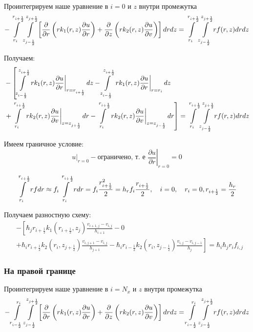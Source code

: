 Проинтегрируем наше уравнение в $ i = 0 $ и $ z $ внутри промежутка
\[
  - \int\limits^{r_{i +\frac{1}{2}}}_{r_{i }} \int\limits^{z_{j +\frac{1}{2}}}_{z_{j -\frac{1}{2}}} \left [ \pdv{}{r} \left ( r k_1(r, z) \pdv{u}{r} \right ) 
  + \pdv{}{z} \left ( rk_2(r, z)\pdv{u}{v} \right ) \right ] dr dz = \int\limits^{r_{i +\frac{1}{2}}}_{r_{i }} \int\limits^{z_{j +\frac{1}{2}}}_{z_{j -\frac{1}{2}}} rf(r, z) dr dz
\]

Получаем:
\begin{align*}
  &- \left [
   \int\limits^{z_{i+\frac{1}{2}}}_{z_{i-\frac{1}{2}}}  \left . r k_1(r, z) \pdv{u}{r} \right \vert_{r = r_{i + \frac{1}{2}}} dz
  - \int\limits^{z_{i+\frac{1}{2}}}_{z_{i-\frac{1}{2}}} \left . r k_1(r, z) \pdv{u}{r} \right \vert_{r = r_{i}} dz
  \right . \\
  &\left . + \int\limits^{r_{i+\frac{1}{2}}}_{r_{i}} \left . rk_2(r, z)\pdv{u}{v} \right \vert_{z = z_{j + \frac{1}{2}}} dr
  - \int\limits^{r_{i+\frac{1}{2}}}_{r_{i}} \left . rk_2(r, z)\pdv{u}{v} \right \vert_{z = z_{j - \frac{1}{2}}} dr
  \right ] = \int\limits^{r_{i +\frac{1}{2}}}_{r_{i }} \int\limits^{z_{j +\frac{1}{2}}}_{z_{j -\frac{1}{2}}} rf(r, z) dr dz
\end{align*}

Имеем граничное условие:
\[
  \left . u \right \vert_{r=0} - \text{ограничено, т. е } \left . \frac{\partial u}{ \partial r} \right |_{r = 0} = 0
\]

\[
  \int\limits^{r_{i+ \frac{1}{2}}}_{r_{i}} rf dr \approx f_i \int\limits^{r_{i + \frac{1}{2}}}_{r_{i}} r dr = 
  f_i \frac{r^2_{i + \frac{1}{2}}}{2} = h_r f_i \frac{r_{i + \frac{1}{2}}}{2},
  \quad i = 0, \quad r_i = 0, r_{i + \frac{1}{2}} = \frac{h_r}{2}
\]


Получаем разностную схему:
\begin{align*}
  &- \left [ 
  \hbar_j r_{i+\frac{1}{2}} k_1(r_{i+\frac{1}{2}}, z_j) \frac{v_{i+1, j} - v_{i, j}}{h_{i + 1}}
  - 0
  \right . \\
  &\left .
  + \hbar_i r_{i+\frac{1}{2}} k_2(r_i, z_{j+\frac{1}{2}}) \frac{v_{i, j + 1} - v_{i, j}}{h_{j + 1}}
  - \hbar_i r_{i-\frac{1}{2}} k_2(r_i, z_{j-\frac{1}{2}}) \frac{v_{i, j} - v_{i, j - 1}}{h_j}
  \right ]  = \hbar_i \hbar_j r_i f_{i, j}
\end{align*}

\subsubsection{На правой границе}
Проинтегрируем наше уравнение в $ i = N_x $ и $ z $ внутри промежутка
\[
  - \int\limits^{r_{i }}_{r_{i -\frac{1}{2}}} \int\limits^{z_{j +\frac{1}{2}}}_{z_{j -\frac{1}{2}}} \left [ \pdv{}{r} \left ( r k_1(r, z) \pdv{u}{r} \right ) 
  + \pdv{}{z} \left ( rk_2(r, z)\pdv{u}{v} \right ) \right ]dr dz = \int\limits^{r_{i }}_{r_{i -\frac{1}{2}}} \int\limits^{z_{j +\frac{1}{2}}}_{z_{j -\frac{1}{2}}} rf(r, z)dr dz
\]

